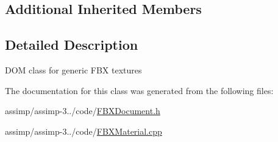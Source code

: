 \subsection*{Additional Inherited Members}


\subsection{Detailed Description}
D\+O\+M class for generic F\+B\+X textures 

The documentation for this class was generated from the following files\+:\begin{DoxyCompactItemize}
\item 
assimp/assimp-\/3../code/\hyperlink{_f_b_x_document_8h}{F\+B\+X\+Document.\+h}\item 
assimp/assimp-\/3../code/\hyperlink{_f_b_x_material_8cpp}{F\+B\+X\+Material.\+cpp}\end{DoxyCompactItemize}
